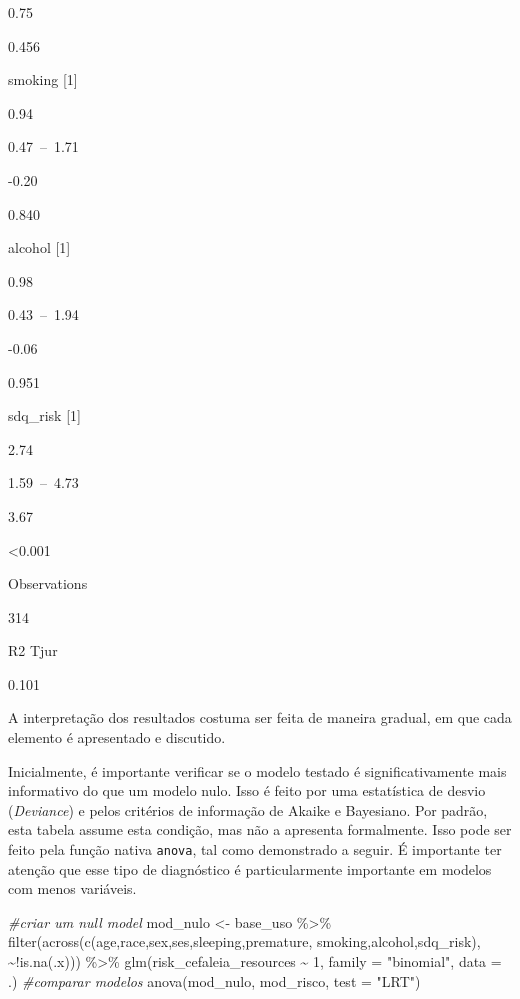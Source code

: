 \documentclass[
]{book}
\newenvironment{Shaded}{\begin{snugshade}}{\end{snugshade}}
\newcommand{\AttributeTok}[1]{\textcolor[rgb]{0.77,0.63,0.00}{#1}}
\newcommand{\CommentTok}[1]{\textcolor[rgb]{0.56,0.35,0.01}{\textit{#1}}}
\newcommand{\DecValTok}[1]{\textcolor[rgb]{0.00,0.00,0.81}{#1}}
\newcommand{\FunctionTok}[1]{\textcolor[rgb]{0.00,0.00,0.00}{#1}}
\newcommand{\NormalTok}[1]{#1}
\newcommand{\OtherTok}[1]{\textcolor[rgb]{0.56,0.35,0.01}{#1}}
\newcommand{\SpecialCharTok}[1]{\textcolor[rgb]{0.00,0.00,0.00}{#1}}
\newcommand{\StringTok}[1]{\textcolor[rgb]{0.31,0.60,0.02}{#1}}
\begin{document}
0.75

0.456

smoking {[}1{]}

0.94

0.47~--~1.71

-0.20

0.840

alcohol {[}1{]}

0.98

0.43~--~1.94

-0.06

0.951

sdq\_risk {[}1{]}

2.74

1.59~--~4.73

3.67

\textless0.001

Observations

314

R2 Tjur

0.101

A interpretação dos resultados costuma ser feita de maneira gradual, em que cada elemento é apresentado e discutido.

Inicialmente, é importante verificar se o modelo testado é significativamente mais informativo do que um modelo nulo. Isso é feito por uma estatística de desvio (\emph{Deviance}) e pelos critérios de informação de Akaike e Bayesiano. Por padrão, esta tabela assume esta condição, mas não a apresenta formalmente. Isso pode ser feito pela função nativa \texttt{anova}, tal como demonstrado a seguir. É importante ter atenção que esse tipo de diagnóstico é particularmente importante em modelos com menos variáveis.

\begin{Shaded}
\begin{Highlighting}[]
\CommentTok{\#criar um null model}
\NormalTok{mod\_nulo }\OtherTok{\textless{}{-}}\NormalTok{ base\_uso }\SpecialCharTok{\%\textgreater{}\%} 
  \FunctionTok{filter}\NormalTok{(}\FunctionTok{across}\NormalTok{(}\FunctionTok{c}\NormalTok{(age,race,sex,ses,sleeping,premature,}
\NormalTok{                  smoking,alcohol,sdq\_risk), }\SpecialCharTok{\textasciitilde{}!}\FunctionTok{is.na}\NormalTok{(.x))) }\SpecialCharTok{\%\textgreater{}\%} 
  \FunctionTok{glm}\NormalTok{(risk\_cefaleia\_resources }\SpecialCharTok{\textasciitilde{}} \DecValTok{1}\NormalTok{, }\AttributeTok{family =} \StringTok{"binomial"}\NormalTok{, }\AttributeTok{data =}\NormalTok{ .)}
\CommentTok{\#comparar modelos}
\FunctionTok{anova}\NormalTok{(mod\_nulo, mod\_risco, }\AttributeTok{test =} \StringTok{"LRT"}\NormalTok{)}
\end{Highlighting}
\end{Shaded}
\end{document}
